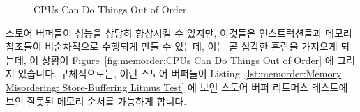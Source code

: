\begin{figure}[tb]
\centering
{}
\caption{CPUs Can Do Things Out of Order}
\end{figure}

스토어 버퍼들이 성능을 상당히 향상시킬 수 있지만, 이것들은 인스트럭션들과
메모리 참조들이 비순차적으로 수행되게 만들 수 있는데, 이는 곧 심각한 혼란을
가져오게 되는데, 이 상황이
Figure~\ref{fig:memorder:CPUs Can Do Things Out of Order} 에 그려져 있습니다.
구체적으로는, 이런 스토어 버퍼들이
Listing~\ref{lst:memorder:Memory Misordering: Store-Buffering Litmus Test} 에
보인 스토어 버퍼 리트머스 테스트에 보인 잘못된 메모리 순서를 가능하게 합니다.

